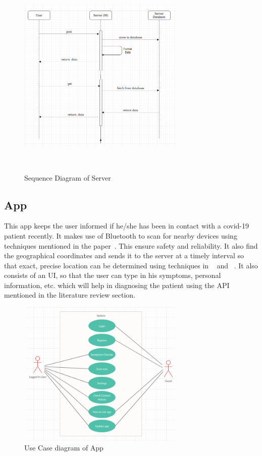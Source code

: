 \documentclass[10pt,twocolumn,letterpaper]{article}
\begin{document}
\begin{figure}[h!]
  \centering
  \includegraphics[width=8cm, height=10cm]{UML_Sequence_Server}
  \caption[Caption for LOF]{Sequence Diagram of Server\footnotemark}
\end{figure}

\pagebreak
\subsection{App}

This app keeps the user informed if he/she has been in contact with a covid-19 patient recently. It makes use of Bluetooth to scan for nearby devices using techniques mentioned in the paper~\cite{5}. This ensure safety and reliability. It also find the geographical coordinates and sends it to the server at a timely interval so that exact, precise location can be determined using techniques in ~\cite{3} and ~\cite{4}.\newline
It also consists of an UI, so that the user can type in his symptoms, personal information, etc. which will help in diagnosing the patient using the API mentioned in the literature review section.

\begin{figure}[h!]
  \centering
  \includegraphics[width=8cm, height=7cm]{UML_UseCase_App}
  \caption[Caption for LOF]{Use Case diagram of App\footnotemark}
\end{figure}
\end{document}

